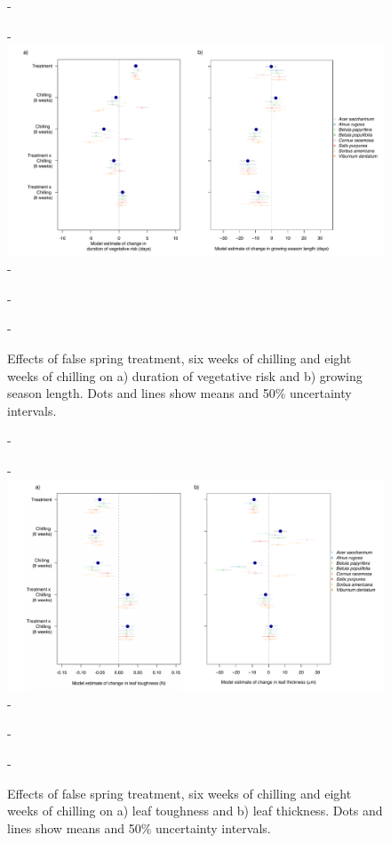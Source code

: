 \documentclass{article}\usepackage[]{graphicx}\usepackage[]{color}
\begin{document}
  {\begin{figure} [H]
  -\begin{center}
  -\includegraphics[width=18cm]{..//analyses/figures/mu_phen.pdf} 
  -\caption{Effects of false spring treatment, six weeks of chilling and eight weeks of chilling on a) duration of vegetative risk and b) growing season length. Dots and lines show means and 50\% uncertainty intervals.}\label{fig:muphen}
  -\end{center}
  -\end{figure}}
  
  {\begin{figure} [H]
  -\begin{center}
  -\includegraphics[width=18cm]{..//analyses/figures/mu_leaftraits.pdf} 
  -\caption{Effects of false spring treatment, six weeks of chilling and eight weeks of chilling on a) leaf toughness and b) leaf thickness. Dots and lines show means and 50\% uncertainty intervals. }\label{fig:muleaf}
  -\end{center}
  -\end{figure}}
  
\end{document}
